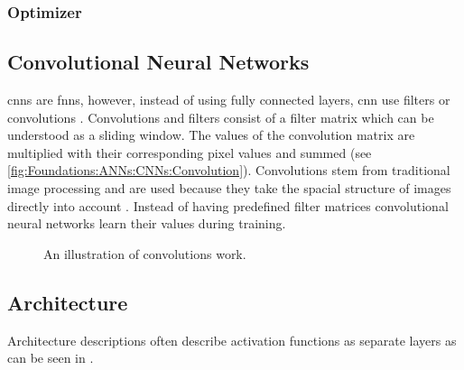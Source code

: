 \subsubsection{Optimizer}
\label{sec:Foundations:NeuralNetworks:Optimizer}



\subsection{Convolutional Neural Networks}
\label{sec:Foundations:NeuralNetworks:CNN}

\Acp{cnn} are \aclp{fnn}, however, instead of using fully connected layers, \ac{cnn} use filters or convolutions \cite{teuwen2020convolutional}. Convolutions and filters consist of a filter matrix which can be understood as a sliding window. The values of the convolution matrix are multiplied with their corresponding pixel values and summed (see \autoref{fig:Foundations:ANNs:CNNs:Convolution}). Convolutions stem from traditional image processing \cite{shih2010image} and are used because they take the spacial structure of images directly into account \cite{nielsen2015neural}. Instead of having predefined filter matrices convolutional neural networks learn their values during training. 

\begin{figure}
    \centering
    \caption{An illustration of convolutions work.}
    \label{fig:Foundations:ANNs:CNNs:Convolution}
\end{figure}


\subsection{Architecture}
\label{sec:Foundations:NeuralNetworks:Architecture}

Architecture descriptions often describe activation functions as separate layers as can be seen in .


